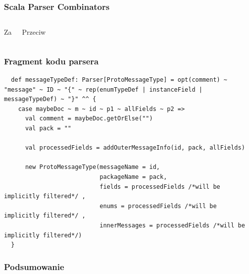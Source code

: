 \documentclass{beamer}
\begin{document}


\begin{frame}
\frametitle{Scala Parser Combinators}

\begin{columns}
 \begin{block}{Za}
  
 \end{block}

 \begin{block}{Przeciw}
  
 \end{block}
\end{columns}

\end{frame}




\begin{frame}[fragile]
\frametitle{Fragment kodu parsera}

\begin{verbatim}
  def messageTypeDef: Parser[ProtoMessageType] = opt(comment) ~ "message" ~ ID ~ "{" ~ rep(enumTypeDef | instanceField | messageTypeDef) ~ "}" ^^ {
    case maybeDoc ~ m ~ id ~ p1 ~ allFields ~ p2 =>
      val comment = maybeDoc.getOrElse("")
      val pack = ""

      val processedFields = addOuterMessageInfo(id, pack, allFields) 

      new ProtoMessageType(messageName = id,
                           packageName = pack,
                           fields = processedFields /*will be implicitly filtered*/ ,
                           enums = processedFields /*will be implicitly filtered*/ ,
                           innerMessages = processedFields /*will be implicitly filtered*/)
  }
\end{verbatim}


\end{frame}



\begin{frame}
\frametitle{Podsumowanie}


\end{frame}

\end{document}
